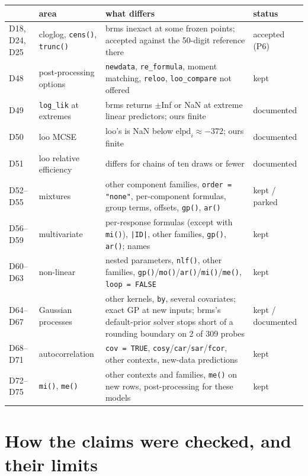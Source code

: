 \documentclass[11pt]{article}
\newcommand{\code}[1]{\texttt{#1}}
\begin{document}
\small
\begin{center}\begin{tabular}{@{}>{\raggedright\arraybackslash}p{}>{\raggedright\arraybackslash}p{}>{\raggedright\arraybackslash}p{}>{\raggedright\arraybackslash}p{}@{}}
\toprule
& area & what differs & status \\
\midrule
D18, D24, D25 & cloglog, \code{cens()}, \code{trunc()} & brms inexact at some frozen points; accepted against the 50-digit reference there & accepted (P6) \\
D48 & post-processing options & \code{newdata}, \code{re\_formula}, moment matching, \code{reloo}, \code{loo\_compare} not offered & kept \\
D49 & \code{log\_lik} at extremes & brms returns $\pm$Inf or NaN at extreme linear predictors; ours finite & documented \\
D50 & loo MCSE & loo's is NaN below $\mathrm{elpd}_i \approx -372$; ours finite & documented \\
D51 & loo relative efficiency & differs for chains of ten draws or fewer & documented \\
D52--D55 & mixtures & other component families, \code{order = "none"}, per-component formulas, group terms, offsets, \code{gp()}, \code{ar()} & kept / parked \\
D56--D59 & multivariate & per-response formulas (except with \code{mi()}), \code{|ID|}, other families, \code{gp()}, \code{ar()}; names & kept \\
D60--D63 & non-linear & nested parameters, \code{nlf()}, other families, \code{gp()}/\code{mo()}/\code{ar()}/\code{mi()}/\code{me()}, \code{loop = FALSE} & kept \\
D64--D67 & Gaussian processes & other kernels, \code{by}, several covariates; exact GP at new inputs; brms's default-prior solver stops short of a rounding boundary on 2 of 309 probes & kept / documented \\
D68--D71 & autocorrelation & \code{cov = TRUE}, \code{cosy}/\code{car}/\code{sar}/\code{fcor}, other contexts, new-data predictions & kept \\
D72--D75 & \code{mi()}, \code{me()} & other contexts and families, \code{me()} on new rows, post-processing for these models & kept \\
\bottomrule
\end{tabular}\end{center}
\normalsize

\section{How the claims were checked, and their limits}
\label{sec:verification}
\end{document}
